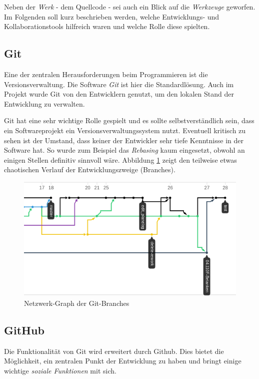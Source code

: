 \documentclass[a4paper, 11pt]{article}
\begin{document}
Neben der \emph{Werk} - dem Quellcode - sei auch ein Blick auf die
\emph{Werkzeuge} geworfen. Im Folgenden soll kurz beschrieben werden, welche
Entwicklungs- und Kollaborationstools hilfreich waren und welche Rolle diese
spielten.

\subsection{Git}

Eine der zentralen Herausforderungen beim Programmieren ist die
Versionsverwaltung. Die Software \emph{Git} ist hier die Standardlösung. Auch im Projekt wurde Git von den Entwicklern genutzt, um den lokalen Stand der Entwicklung zu verwalten. 

Git hat eine sehr wichtige Rolle gespielt und es sollte selbstverständlich
sein, dass ein Softwareprojekt ein Versionsverwaltungssystem nutzt. Eventuell
kritisch zu sehen ist der Umstand, dass keiner der Entwickler sehr tiefe
Kenntnisse in der Software hat. So wurde zum Beispiel das \emph{Rebasing} kaum
eingesetzt, obwohl an einigen Stellen definitiv sinnvoll wäre. Abbildung
\ref{fig:git_network} zeigt den teilweise etwas chaotischen Verlauf der
Entwicklungszweige (Branches).

\begin{figure}[htpb]
    \centering
    \includegraphics[width=\textwidth]{images/git_network.png}
    \caption{Netzwerk-Graph der Git-Branches}
    \label{fig:git_network}
\end{figure}

\subsection{GitHub}

Die Funktionalität von Git wird erweitert durch Github. Dies bietet die
Möglichkeit, ein zentralen Punkt der Entwicklung zu haben und bringt einige
wichtige \emph{soziale Funktionen} mit sich.
\end{document}
